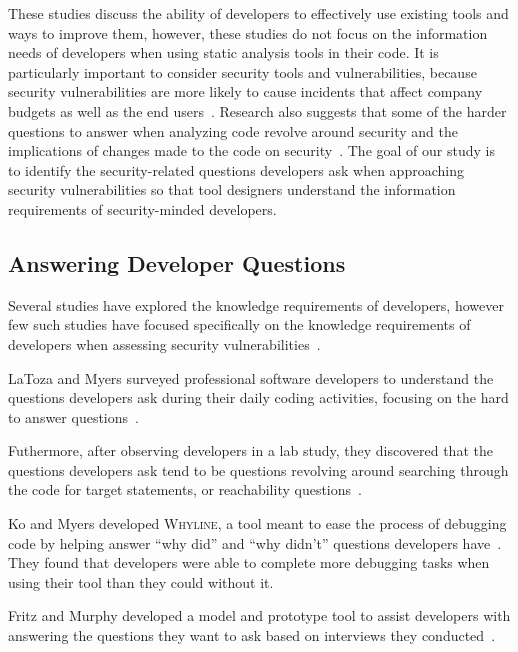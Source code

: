 \documentclass[conference]{IEEEtran}
\begin{document}
These studies discuss the ability of developers to effectively use existing tools and ways to improve them, however, these studies do not focus on the information needs of developers when using static analysis tools in their code.
It is particularly important to consider security tools and vulnerabilities, because security vulnerabilities are more likely to cause incidents that affect company budgets as well as the end users~\cite{chen2002mops}. 
Research also suggests that some of the harder questions to answer when analyzing code revolve around security and the implications of changes made to the code on security~\cite{latoza2010hard}.  
The goal of our study is to identify the security-related questions developers ask when approaching security vulnerabilities so that tool designers understand the information requirements of security-minded developers.

\subsection{Answering Developer Questions}
\label{questions}
Several studies have explored the knowledge requirements of developers, however few such studies have focused specifically on the knowledge requirements of developers when assessing security vulnerabilities~\cite{begel2014analyze, latoza2010hard, latoza2010developers}.

LaToza and Myers surveyed professional software developers to understand the questions developers ask during their daily coding activities, focusing on the hard to answer questions~\cite{latoza2010hard}. 

Futhermore, after observing developers in a lab study, they discovered that the questions developers ask tend to be questions revolving around searching through the code for target statements, or reachability questions~\cite{latoza2010developers}. 

Ko and Myers developed \textsc{Whyline}, a tool meant to ease the process of debugging code by helping answer ``why did'' and ``why didn't'' questions developers have~\cite{ko2004designing}. They found that developers were able to complete more debugging tasks when using their tool than they could without it.

Fritz and Murphy developed a model and prototype tool to assist developers with answering the questions they want to ask based on interviews they conducted~\cite{fritz2010using}.

\end{document}
